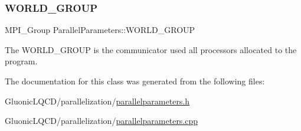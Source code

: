 \subsubsection{\texorpdfstring{WORLD\_GROUP}{WORLD\_GROUP}}
{\footnotesize\ttfamily M\+P\+I\+\_\+\+Group Parallel\+Parameters\+::\+W\+O\+R\+L\+D\+\_\+\+G\+R\+O\+UP\hspace{0.3cm}{\ttfamily [static]}}



The W\+O\+R\+L\+D\+\_\+\+G\+R\+O\+UP is the communicator used all processors allocated to the program. 



The documentation for this class was generated from the following files\+:\begin{DoxyCompactItemize}
\item 
Gluonic\+L\+Q\+C\+D/parallelization/\mbox{\hyperlink{parallelparameters_8h}{parallelparameters.\+h}}\item 
Gluonic\+L\+Q\+C\+D/parallelization/\mbox{\hyperlink{parallelparameters_8cpp}{parallelparameters.\+cpp}}\end{DoxyCompactItemize}
